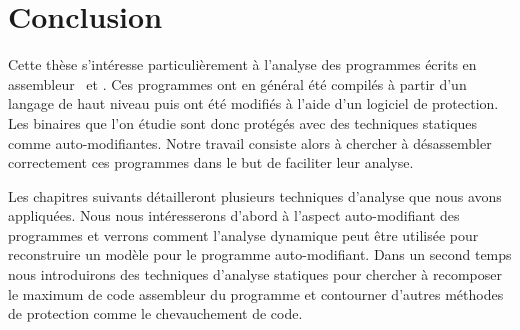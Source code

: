 \section{Conclusion}
Cette thèse s'intéresse particulièrement à l'analyse des programmes écrits en assembleur \xq\ et \xs. Ces programmes ont en général été compilés à partir d'un langage de haut niveau puis ont été modifiés à l'aide d'un logiciel de protection. Les binaires que l'on étudie sont donc protégés avec des techniques statiques comme auto-modifiantes. Notre travail consiste alors à chercher à désassembler correctement ces programmes dans le but de faciliter leur analyse.

Les chapitres suivants détailleront plusieurs techniques d'analyse que nous avons appliquées. Nous nous intéresserons d'abord à l'aspect auto-modifiant des programmes et verrons comment l'analyse dynamique peut être utilisée pour reconstruire un modèle pour le programme auto-modifiant. Dans un second temps nous introduirons des techniques d'analyse statiques pour chercher à recomposer le maximum de code assembleur du programme et contourner d'autres méthodes de protection comme le chevauchement de code.

